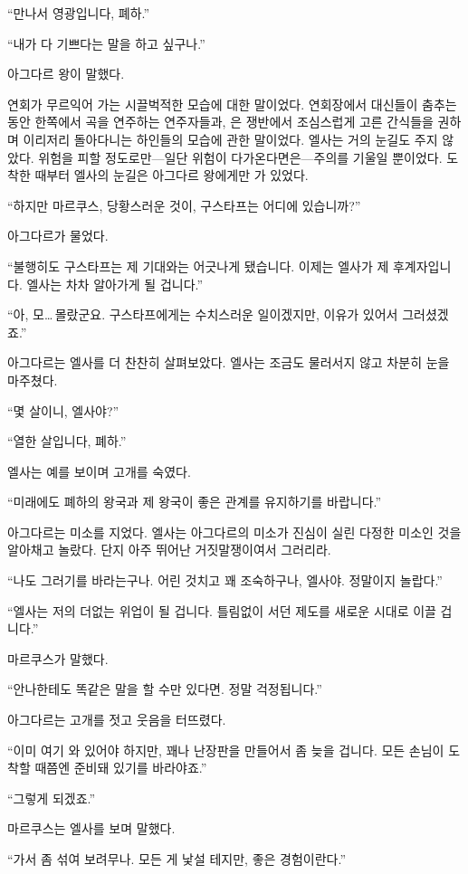 ``만나서 영광입니다, 폐하.''

``내가 다 기쁘다는 말을 하고 싶구나.''

아그다르 왕이 말했다.

연회가 무르익어 가는 시끌벅적한 모습에 대한 말이었다. 연회장에서 대신들이 춤추는 동안 한쪽에서 곡을 연주하는 연주자들과, 은 쟁반에서 조심스럽게 고른 간식들을 권하며 이리저리 돌아다니는 하인들의 모습에 관한 말이었다. 엘사는 거의 눈길도 주지 않았다. 위험을 피할 정도로만—일단 위험이 다가온다면은—주의를 기울일 뿐이었다. 도착한 때부터 엘사의 눈길은 아그다르 왕에게만 가 있었다.

``하지만 마르쿠스, 당황스러운 것이, 구스타프는 어디에 있습니까?''

아그다르가 물었다.

``불행히도 구스타프는 제 기대와는 어긋나게 됐습니다. 이제는 엘사가 제 후계자입니다. 엘사는 차차 알아가게 될 겁니다.''

``아, 모\ldots\,몰랐군요. 구스타프에게는 수치스러운 일이겠지만, 이유가 있어서 그러셨겠죠.''

아그다르는 엘사를 더 찬찬히 살펴보았다. 엘사는 조금도 물러서지 않고 차분히 눈을 마주쳤다.

``몇 살이니, 엘사야?''

``열한 살입니다, 폐하.''

엘사는 예를 보이며 고개를 숙였다.

``미래에도 폐하의 왕국과 제 왕국이 좋은 관계를 유지하기를 바랍니다.''

아그다르는 미소를 지었다. 엘사는 아그다르의 미소가 진심이 실린 다정한 미소인 것을 알아채고 놀랐다. 단지 아주 뛰어난 거짓말쟁이여서 그러리라.

``나도 그러기를 바라는구나. 어린 것치고 꽤 조숙하구나, 엘사야. 정말이지 놀랍다.''

``엘사는 저의 더없는 위업이 될 겁니다. 틀림없이 서던 제도를 새로운 시대로 이끌 겁니다.''

마르쿠스가 말했다.

``안나한테도 똑같은 말을 할 수만 있다면. 정말 걱정됩니다.''

아그다르는 고개를 젓고 웃음을 터뜨렸다.

``이미 여기 와 있어야 하지만, 꽤나 난장판을 만들어서 좀 늦을 겁니다. 모든 손님이 도착할 때쯤엔 준비돼 있기를 바라야죠.''

``그렇게 되겠죠.''

마르쿠스는 엘사를 보며 말했다.

``가서 좀 섞여 보려무나. 모든 게 낯설 테지만, 좋은 경험이란다.''

